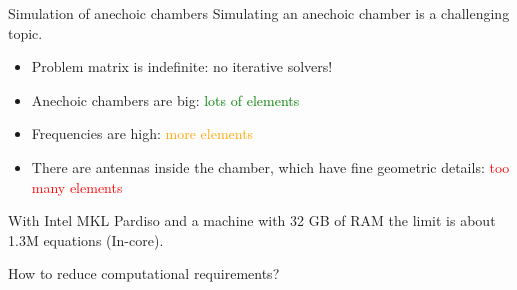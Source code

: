 \documentclass{beamer}
\begin{document}
\begin{frame}{Simulation of anechoic chambers}
    Simulating an anechoic chamber is a challenging topic.
    \begin{itemize}
        \pause
        \item Problem matrix is indefinite: no iterative solvers!
        \pause
    \item Anechoic chambers are big: \textcolor{green}{lots of elements}
        \pause
    \item Frequencies are high: \textcolor{orange}{more elements}
        \pause
    \item There are antennas inside the chamber, which have fine geometric details: \textcolor{red}{too many elements}
    \end{itemize}

    \pause
    \vspace{3mm}
    With Intel MKL Pardiso and a machine with 32 GB of RAM the limit is about 1.3M equations (In-core).

    \vspace{3mm}
    How to reduce computational requirements?

\end{frame}
\end{document}
